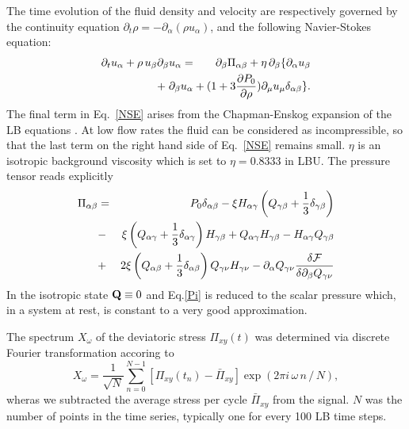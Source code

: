 \documentclass[aps,pre,reprint,superscriptaddress, twocolumn]{revtex4}
\begin{document}
The time evolution of the fluid density and velocity are respectively governed
by the continuity equation
$\partial_t \rho = -\partial_\alpha(\rho u_\alpha)$, and
the following Navier-Stokes equation:
\begin{eqnarray}
\partial_t u_\alpha +\rho \,u_\beta \partial_\beta u_\alpha
&=& \partial_\beta \Pi_{\alpha \beta}+ \eta\, \partial_\beta \{ \partial_\alpha u_\beta \nonumber\\
& &\hspace*{-1.5cm} +\; \partial_\beta u_\alpha
+(1+3\frac{\partial P_0}{\partial\rho} )\partial_\mu u_\mu \delta_{\alpha \beta}\}. 
\label{NSE}
\end{eqnarray}
The final term in Eq.~\ref{NSE} arises from the Chapman-Enskog expansion
of the LB equations \cite{Denniston:2001}.
At low flow rates the fluid can be considered as incompressible, so that the
last term on the right hand side of Eq.~\ref{NSE} remains small.
$\eta$ is an isotropic background viscosity which is set to $\eta=0.8333$ in LBU.
The pressure tensor reads explicitly
\begin{eqnarray}
\Pi_{\alpha \beta}&=&P_0 \delta_{\alpha\beta}
-\xi H_{\alpha \gamma}\left(Q_{\gamma \beta} +\frac{1}{3} \delta_{\gamma \beta}\right)\nonumber\\
&-&\xi \left(Q_{\alpha \gamma} +\frac{1}{3} \delta_{\alpha \gamma}\right) H_{\gamma \beta} + Q_{\alpha \gamma}H_{\gamma \beta}-H_{\alpha \gamma} Q_{\gamma \beta} \nonumber\\
&+&2 \xi  \left(Q_{\alpha \beta} +\frac{1}{3} \delta_{\alpha \beta}\right) Q_{\gamma \nu} H_{\gamma \nu}
- \partial_\alpha Q_{\gamma \nu} \frac{\delta{\cal F}}{\delta \partial_{\beta} Q_{\gamma \nu}}\nonumber\\
\label{Pi}
\end{eqnarray}
In the isotropic state ${\bf Q}\equiv 0$ and Eq.\ref{Pi} is reduced to the
scalar pressure which, in a system at rest, is constant to a very good
approximation.

The spectrum $X_\omega$ of the deviatoric stress $\Pi_{xy}(t)$ was determined via discrete Fourier transformation accoring to
\begin{equation}
X_\omega=\frac{1}{\sqrt{N}}\sum_{n=0}^{N-1} \left[\Pi_{xy}(t_n) - \bar{\Pi}_{xy}\right] \exp(2\pi i \, \omega \,n\,/\,N),
\label{spectrum}
\end{equation}
wheras we subtracted the average stress per cycle $\bar{\Pi}_{xy}$ from the signal.
$N$ was the number of points in the time series, typically one for every 100 LB time steps. 
\end{document}
